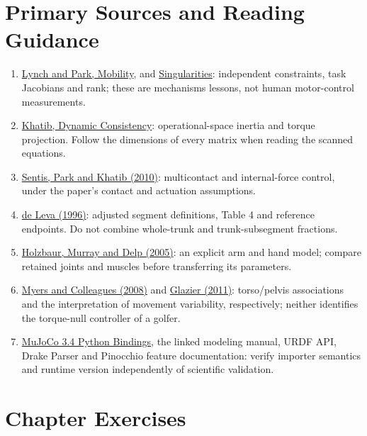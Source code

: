 \section{Primary Sources and Reading Guidance}

\begin{enumerate}
\item \href{https://modernrobotics.northwestern.edu/nu-gm-book-resource/2-2-degrees-of-freedom-of-a-robot/}{Lynch and Park, Mobility}, and \href{https://modernrobotics.northwestern.edu/nu-gm-book-resource/5-3-singularities/}{Singularities}: independent constraints, task Jacobians and rank; these are mechanisms lessons, not human motor-control measurements.
\item \href{https://khatib.stanford.edu/publications/pdfs/Khatib_1990_2.pdf}{Khatib, Dynamic Consistency}: operational-space inertia and torque projection. Follow the dimensions of every matrix when reading the scanned equations.
\item \href{https://cs.stanford.edu/groups/manips/publications/pdfs/Sentis_2010_TRO.pdf}{Sentis, Park and Khatib (2010)}: multicontact and internal-force control, under the paper's contact and actuation assumptions.
\item \href{https://doi.org/10.1016/0021-9290(95)00178-6}{de Leva (1996)}: adjusted segment definitions, Table 4 and reference endpoints. Do not combine whole-trunk and trunk-subsegment fractions.
\item \href{https://pubmed.ncbi.nlm.nih.gov/16078622/}{Holzbaur, Murray and Delp (2005)}: an explicit arm and hand model; compare retained joints and muscles before transferring its parameters.
\item \href{https://pubmed.ncbi.nlm.nih.gov/17852693/}{Myers and Colleagues (2008)} and \href{https://pubmed.ncbi.nlm.nih.gov/21699094/}{Glazier (2011)}: torso/pelvis associations and the interpretation of movement variability, respectively; neither identifies the torque-null controller of a golfer.
\item \href{https://mujoco.readthedocs.io/en/3.4.0/python.html}{MuJoCo 3.4 Python Bindings}, the linked modeling manual, URDF API, Drake Parser and Pinocchio feature documentation: verify importer semantics and runtime version independently of scientific validation.
\end{enumerate}

\section{Chapter Exercises}
\label{exercises:ex:ch23_exercises}

